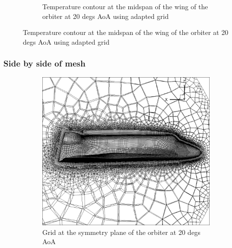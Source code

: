 \begin{figure}[H]
\begin{subfigure}[b]{0.65\textwidth}
		 \caption{Temperature contour at the midspan of the wing of the orbiter at 20 degs AoA using adapted grid}
		 \label{fig: 20_adapt_wing_temp_contour}
    \end{subfigure}
\end{figure}

\subsubsection{Side by side of mesh}

\begin{figure}[H]

	\centering
    \begin{subfigure}[b]{0.65\textwidth}
         \centering
		 \includegraphics[width=\textwidth]{report_images/20_grid.png}
		 \caption{Grid at the symmetry plane of the orbiter at 20 degs AoA}
		 \label{fig: 20_grid}
    \end{subfigure} 
    \begin{subfigure}[b]{0.65\textwidth}
         \centering

\end{subfigure}
\end{figure}
